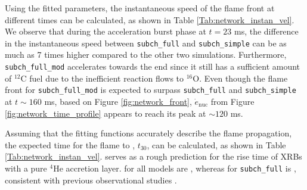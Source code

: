 \documentclass[preprint,times,tighten,linenumbers,trackchanges]{aastex631}
\begin{document}
Using the fitted parameters, the instantaneous speed of the flame front at different times can be calculated, as shown in Table \ref{Tab:network_instan_vel}. We observe that during the acceleration burst phase at $t = 23$ ms, the difference in the instantaneous speed between {\tt subch\_full} and {\tt subch\_simple} can be as much as 7 times higher compared to the other two simulations. Furthermore, {\tt subch\_full\_mod} accelerates towards the end since it still has a sufficient amount of ${}^{12}$C fuel due to the inefficient reaction flows to ${}^{16}$O. Even though the flame front for {\tt subch\_full\_mod} is expected to surpass {\tt subch\_full} and {\tt subch\_simple} at $t \sim 160$ ms, based on Figure \ref{fig:network_front}, $\dot{e}_{\textrm{nuc}}$ from Figure \ref{fig:network_time_profile} appears to reach its peak at $\sim 120$ ms.   

Assuming that the fitting functions accurately describe the flame propagation, the expected time for the flame to  , $t_{30}$, can be calculated, as shown in Table \ref{Tab:network_instan_vel}.    serves as a rough prediction for the rise time of XRBs with a pure ${}^{4}$He accretion layer.   for all models are  , whereas   for {\tt subch\_full} is  , consistent with previous observational studies \citep{galloway:2008}.  
\end{document}
